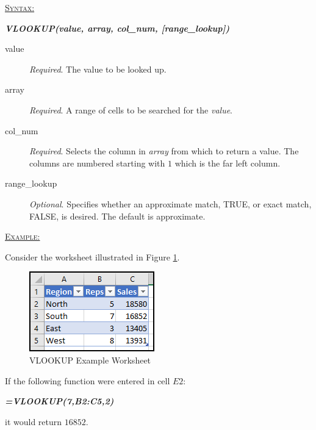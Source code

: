 \begin{addmargin}[1cm]{0cm}
	
	\medskip
	\underline{\textsc{Syntax:}}
	\medskip
	
	{\color{Syntax}
		\noindent\textbf{\textit{VLOOKUP(value, array, col\_num, [range\_lookup])}}
	}
	
	\begin{description}
		\item[value] \textit{Required}. The value to be looked up.
		\item[array] \textit{Required}. A range of cells to be searched for the \textit{value}.
		\item[col\_num] \textit{Required}. Selects the column in \textit{array} from which to return a value. The columns are numbered starting with $ 1 $ which is the far left column. 
		\item[range\_lookup] \textit{Optional}. Specifies whether an approximate match, TRUE, or exact match, FALSE, is desired. The default is approximate.
	\end{description}

	\medskip
	\noindent\underline{\textsc{Example:}}
	\medskip
	
	\noindent Consider the worksheet illustrated in Figure \ref{apa:vlk}.
	
	\begin{figure}[H]
		\centering
		\includegraphics[width=\maxwidth{.45\linewidth}]{gfx/apa_fig01}
		\caption{VLOOKUP Example Worksheet}
		\label{apa:vlk}
	\end{figure}
	
	\noindent If the following function were entered in cell $ E2 $:
	
	{\color{Syntax}
		\textit{\textbf{=VLOOKUP(7,B2:C5,2)}}
	}
	
	\noindent it would return $ 16852 $.

\end{addmargin}




